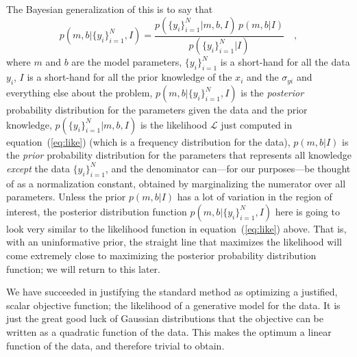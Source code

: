 \documentclass[12pt,twoside]{article}
\newcommand{\equationname}{equation}
\newcounter{problem}
\newcommand{\setofall}[3]{\{{#1}\}_{{#2}}^{{#3}}}
\newcommand{\ally}{\setofall{y_i}{i=1}{N}}
\newcommand{\like}{\mathscr{L}}
\begin{document}
The Bayesian generalization of this is to say that
\begin{equation}
p(m,b|\ally,I) = \frac{p(\ally|m,b,I)\,p(m,b|I)}{p(\ally|I)} \quad ,
\end{equation}
where $m$ and $b$ are the model parameters, $\ally$ is a short-hand
for all the data $y_i$, $I$ is a short-hand for all the prior
knowledge of the $x_i$ and the $\sigma_{yi}$ and everything else about
the problem, $p(m,b|\ally,I)$ is the \emph{posterior} probability
distribution for the parameters given the data and the prior
knowledge, $p(\ally|m,b,I)$ is the likelihood $\like$ just computed in
\equationname~(\ref{eq:like}) (which is a frequency distribution for
the data), $p(m,b|I)$ is the \emph{prior} probability distribution for
the parameters that represents all knowledge \emph{except} the data
$\ally$, and the denominator can---for our purposes---be thought of as
a normalization constant, obtained by marginalizing the numerator over
all parameters. Unless the prior $p(m,b|I)$ has a lot of variation in
the region of interest, the posterior distribution function
$p(m,b|\ally,I)$ here is going to look very similar to the likelihood
function in \equationname~(\ref{eq:like}) above.  That is, with an
uninformative prior, the straight line that maximizes the likelihood
will come extremely close to maximizing the posterior probability
distribution function; we will return to this later.

We have succeeded in justifying the standard method as optimizing a
justified, scalar objective function; the likelihood of a generative
model for the data.  It is just the great good luck of Gaussian
distributions that the objective can be written as a quadratic
function of the data.  This makes the optimum a linear function
of the data, and therefore trivial to obtain.
\end{document}
